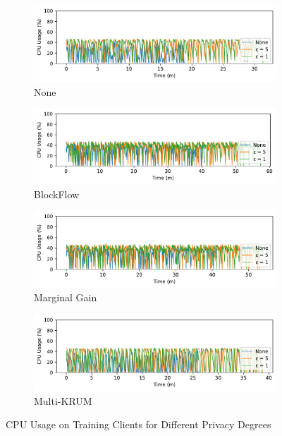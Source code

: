 \begin{figure}[!ht]
    \centering
    \begin{subfigure}[b]{0.49\textwidth}
        \centering
        \includegraphics[width=\textwidth]{graphics/05_priv_cpu_none_client.pdf}
        \caption{None}
    \end{subfigure}
    \hfill
    \begin{subfigure}[b]{0.49\textwidth}
        \centering
        \includegraphics[width=\textwidth]{graphics/05_priv_cpu_blockflow_client.pdf}
        \caption{BlockFlow}
    \end{subfigure}
    \hfill
    \begin{subfigure}[b]{0.49\textwidth}
        \centering
        \includegraphics[width=\textwidth]{graphics/05_priv_cpu_marginalgain_client.pdf}
        \caption{Marginal Gain}
    \end{subfigure}
    \hfill
    \begin{subfigure}[b]{0.49\textwidth}
        \centering
        \includegraphics[width=\textwidth]{graphics/05_priv_cpu_multikrum_client.pdf}
        \caption{Multi-KRUM}
    \end{subfigure}
    \caption{CPU Usage on Training Clients for Different Privacy Degrees}
    \label{fig:cpu_priv_degree_clients}
\end{figure}

